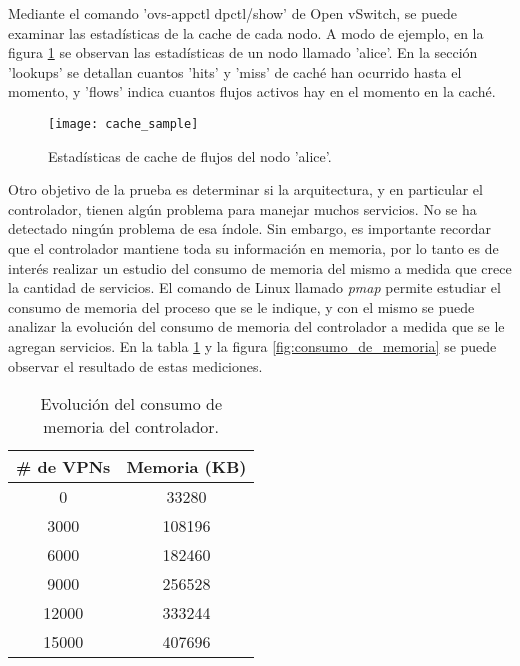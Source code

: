 Mediante el comando 'ovs-appctl dpctl/show' de Open vSwitch, se puede examinar las estadísticas de la cache de cada nodo. A modo de ejemplo, en la figura \ref{fig:cache_sample} se observan las estadísticas de un nodo llamado 'alice'. En la sección 'lookups' se detallan cuantos 'hits' y 'miss' de caché han ocurrido hasta el momento, y 'flows' indica cuantos flujos activos hay en el momento en la caché.

\begin{figure}[H]
	\caption{Estadísticas de cache de flujos del nodo 'alice'.}
	\texttt{[image: cache\_sample]}
	\centering
	\label{fig:cache_sample}
\end{figure}

Otro objetivo de la prueba es determinar si la arquitectura, y en particular el controlador, tienen algún problema para manejar muchos servicios. No se ha detectado ningún problema de esa índole. Sin embargo, es importante recordar que el controlador mantiene toda su información en memoria, por lo tanto es de interés realizar un estudio del consumo de memoria del mismo a medida que crece la cantidad de servicios. El comando de Linux llamado \textit{pmap} permite estudiar el consumo de memoria del proceso que se le indique, y con el mismo se puede analizar la evolución del consumo de memoria del controlador a medida que se le agregan servicios. En la tabla \ref{table:consumo_de_memoria} y la figura \ref{fig:consumo_de_memoria} se puede observar el resultado de estas mediciones. \\

\begin{table}[ht]
	\caption{Evolución del consumo de memoria del controlador.}
	\centering 
	\begin{tabular}{c c}
		\hline\hline
		\# de VPNs & Memoria (KB) \\ [0.5ex]
		\hline
		0 & 33280 \\
		3000 & 108196 \\
		6000 & 182460 \\
		9000 & 256528 \\
		12000 & 333244 \\
		15000 & 407696 \\ [1ex]
		\hline
	\end{tabular}
	\label{table:consumo_de_memoria}
\end{table}

